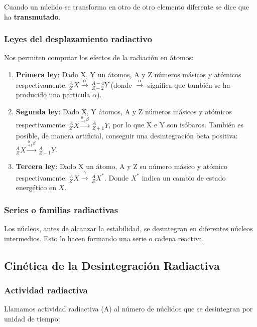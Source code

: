 \documentclass[10pt]{article}
\begin{document}
Cuando un núclido se transforma en otro de otro elemento diferente se dice que ha \textbf{transmutado}.

\subsubsection{Leyes del desplazamiento radiactivo}

Nos permiten computar los efectos de la radiación en átomos:

\begin{enumerate}
    \item \textbf{Primera ley}: Dado X, Y un átomos, A y Z números másicos y atómicos respectivamente: $ ^{A}_{Z} X \xrightarrow{\alpha} \ ^{A - 4}_{Z - 2} Y $ (donde $ \xrightarrow{\alpha} $ significa que también se ha producido una partícula $ \alpha $).
    \item \textbf{Segunda ley}: Dado X, Y átomos, A y Z números másicos y atómicos respectivamente: $ ^{A}_{Z} X \xrightarrow{^{0}_{-1}\beta} \ ^{A}_{Z + 1} Y $, por lo que X e Y son isóbaros. También es posible, de manera artificial, conseguir una desintegración beta positiva: $ ^{A}_{Z} X \xrightarrow{^{0}_{+1}\beta} \ ^{A}_{Z - 1} Y $.
    \item \textbf{Tercera ley}: Dado X un átomo, A y Z su número másico y atómico respectivamente: $ ^{A}_{Z} X \xrightarrow{\gamma} \ ^{A}_{Z} X^{*} $. Donde $ X^{*} $ indica un cambio de estado energético en $ X $.
\end{enumerate}

\subsubsection{Series o familias radiactivas}

Los núcleos, antes de alcanzar la estabilidad, se desintegran en diferentes núcleos intermedios. Esto lo hacen formando una serie o cadena reactiva.

\subsection{Cinética de la Desintegración Radiactiva}

\subsubsection{Actividad radiactiva}

Llamamos actividad radiactiva (A) al número de núclidos que se desintegran por unidad de tiempo:
\end{document}
